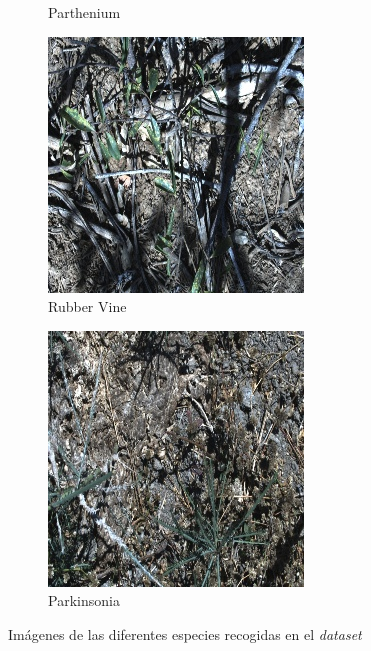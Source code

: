 \begin{figure}[!h]
\begin{subfigure}{0.24\textwidth}
        \caption{Parthenium}
    \end{subfigure}
    \hfill
    \begin{subfigure}{0.24\textwidth}
        \includegraphics[width=\textwidth]{figuras/problema/rubber_vine.jpg}
        \caption{Rubber Vine}
    \end{subfigure}
    \hfill
    \begin{subfigure}{0.24\textwidth}
        \includegraphics[width=\textwidth]{figuras/problema/parkinsonia.jpg}
        \caption{Parkinsonia}
    \end{subfigure}
    \caption{Imágenes de las diferentes especies recogidas en el \textit{dataset}}
    \label{fig:dataset_ejemplo_grande}
\end{figure}

